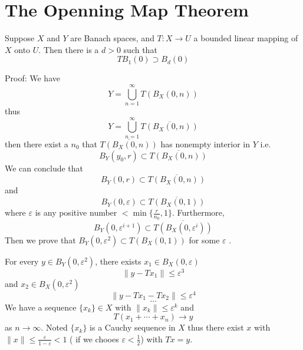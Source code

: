 \documentclass[12pt, oneside]{book}
\begin{document}
\section{The Openning Map Theorem}
\begin{theorem}
    Suppose $X$ and $Y$ are Banach spaces, and $T: X \rightarrow U$ a bounded linear mapping of $X$ onto $U$. Then there is a $d>0$ such that
    \begin{equation*}
        T B_1(0) \supset B_d(0)
    \end{equation*}

    Proof:
    We have
    \begin{equation*}
        Y
        =
        \bigcup_{n=1}^\infty T(B_X(0,n))
    \end{equation*}
    thus
    \begin{equation*}
        Y
        =
        \bigcup_{n=1}^\infty \overline{T(B_X(0,n))}
    \end{equation*}
    then there exist a $n_0$ that $\overline{T(B_X(0,n))}$ has nonempty interior in $Y$ i.e.
    \begin{equation*}
        B_Y(y_0,r)
        \subset
        \overline{T(B_X(0,n))}
    \end{equation*}
    We can conclude that
    \begin{equation*}
        B_Y(0,r)
        \subset
        \overline{T(B_X(0,n))}
    \end{equation*}
    and
    \begin{equation*}
        B_Y(0,\varepsilon)
        \subset
        \overline{T(B_X(0,1))}
    \end{equation*}
    where $\varepsilon$ is any positive number $< \min\{\frac{r}{n_0},1\}$. Furthermore,
    \begin{equation*}
        B_Y(0,\varepsilon^{i+1})
        \subset
        \overline{T(B_X(0,\varepsilon^i))}
    \end{equation*}
    Then we prove that  $B_Y(0,\varepsilon^2)
        \subset
        T(B_X(0,1))$ for some $\varepsilon$ .

    For every $y\in B_Y(0,\varepsilon^2)$, there exists $x_1 \in B_X(0,\varepsilon)$
    \begin{equation*}
        \|y-Tx_1\| \leq \varepsilon^3
    \end{equation*}
    and $x_2\in B_X(0,\varepsilon^2)$
    \begin{equation*}
        \|y-Tx_1 -Tx_2\| \leq \varepsilon^4
    \end{equation*}
    \begin{equation*}
        \ldots
    \end{equation*}
    We have a sequence $\{x_k\} \in X$ with $\|x_k\| \leq \varepsilon^{k}$ and
    \begin{equation*}
        T(x_1+\cdots +x_n)
        \to
        y
    \end{equation*}
    as $n\to \infty$. Noted $\{x_k\}$ is a Cauchy sequence in $X$ thus there exist $x$ with $\|x\|\leq \frac{\varepsilon}{1-\varepsilon}
        <1$ ( if we chooes $\varepsilon < \frac{1}{2}$) with $Tx =y$.

\end{theorem}
\end{document}
